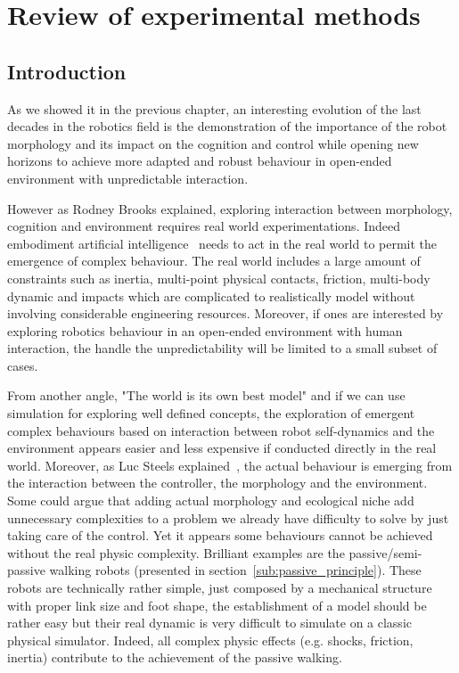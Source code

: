 
% 
\chapter{Review of experimental methods} %
\label{cha:experimental-methods}



\section{Introduction} %
\label{sec:platform-introduction}

As we showed it in the previous chapter, an interesting evolution of the last decades in the robotics field is the demonstration of the importance of the robot morphology and its impact on the cognition and control while opening new horizons to achieve more adapted and robust behaviour in open-ended environment with unpredictable interaction.

However as Rodney Brooks explained, exploring interaction between morphology, cognition and environment requires real world experimentations. Indeed embodiment artificial intelligence~\parencite{Pfeifer07} needs to act in the real world to permit the emergence of complex behaviour. The real world includes a large amount of constraints such as inertia, multi-point physical contacts, friction, multi-body dynamic and impacts which are complicated to realistically model without involving considerable engineering resources. Moreover, if ones are interested by exploring robotics behaviour in an open-ended environment with human interaction, the handle the unpredictability will be limited to a small subset of cases.

From another angle, "The world is its own best model" and if we can use simulation for exploring well defined concepts, the exploration of emergent complex behaviours based on interaction between robot self-dynamics and the environment appears easier and less expensive if conducted directly in the real world.
Moreover, as Luc Steels explained~\parencite{Steels1991emergence}, the actual behaviour is emerging from the interaction between the controller, the morphology and the environment. Some could argue that adding actual morphology and ecological niche add unnecessary complexities to a problem we already have difficulty to solve by just taking care of the control. Yet it appears some behaviours cannot be achieved without the real physic complexity. Brilliant examples are the passive/semi-passive walking robots (presented in section~\ref{sub:passive_principle}). These robots are technically rather simple, just composed by a mechanical structure with proper link size and foot shape, the establishment of a model should be rather easy but their real dynamic is very difficult to simulate on a classic physical simulator. Indeed, all complex physic effects (e.g. shocks, friction, inertia) contribute to the achievement of the passive walking.

